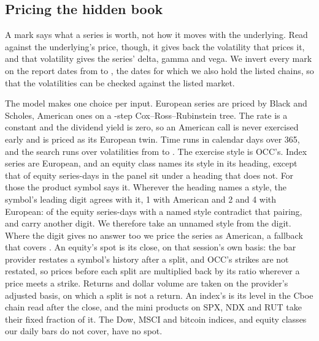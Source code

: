 \documentclass[11pt]{article}
\begin{document}
\subsection{Pricing the hidden book}
\label{sec:pricing}

A mark says what a series is worth, not how it moves with the underlying. Read against
the underlying's price, though, it gives back the volatility that prices it, and that
volatility gives the series' delta, gamma and vega. We invert every mark on the
\IvDates{} report dates from \IvFirstDate{} to \IvLastDate{}, the dates for which we
also hold the listed chains, so that the volatilities can be checked against the listed
market.

The model makes one choice per input. European series are priced by Black and Scholes,
American ones on a \IvTreeSteps{}-step Cox--Ross--Rubinstein tree. The rate is a constant
\IvRate{} and the dividend yield is zero, so an American call is never exercised early
and is priced as its European twin. Time runs in calendar days over 365, and the search
runs over volatilities from \IvSigmaLow{} to \IvSigmaHigh{}. The exercise style is
OCC's. Index series are European, and an equity class names its style in its heading,
except that \IvUnreadShare{} of equity series-days in the panel sit under a heading that
does not. For those the product symbol says it. Wherever the heading names a style, the
symbol's leading digit agrees with it, 1 with American and 2 and 4 with European:
\IvPrefixContradict{} of the \IvPrefixMarked{} equity series-days with a named style
contradict that pairing, and \IvPrefixOther{} carry another digit. We therefore take an
unnamed style from the digit. Where the digit gives no answer too we price the series as
American, a fallback that covers \IvFallbackRows{}. An equity's spot is its close, on
that session's own basis: the bar provider restates a symbol's history after a split,
and OCC's strikes are not restated, so prices before each split are multiplied back by
its ratio wherever a price meets a strike. Returns and dollar volume are taken on the
provider's adjusted basis, on which a split is not a return. An
index's is its level in the Cboe chain read after the close, and the mini products on
SPX, NDX and RUT take their fixed fraction of it. The Dow, MSCI and bitcoin indices, and
equity classes our daily bars do not cover, have no spot.
\end{document}
